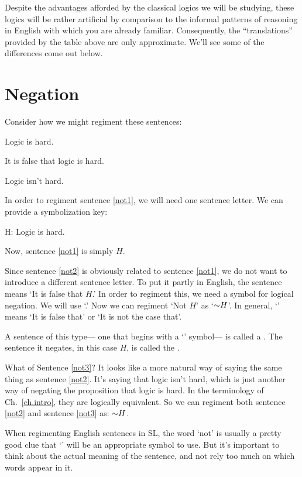 Despite the advantages afforded by the classical logics we will be studying, these logics will be rather artificial by comparison to the informal patterns of reasoning in English with which you are already familiar.
Consequently, the ``translations'' provided by the table above are only approximate.
We'll see some of the differences come out below.

\section{Negation}
Consider how we might regiment these sentences:
\begin{earg}
\item[\ex{not1}] Logic is hard.
\item[\ex{not2}] It is false that logic is hard.
\item[\ex{not3}] Logic isn't hard.
\end{earg}

In order to regiment sentence \ref{not1}, we will need one sentence letter.
We can provide a symbolization key:

\begin{ekey}
\item[H:]Logic is hard.
\end{ekey}

Now, sentence \ref{not1} is simply $H$. 

Since sentence \ref{not2} is obviously related to sentence \ref{not1}, we do not want to introduce a different sentence letter.
To put it partly in English, the sentence means `It is false that $H$.'
In order to regiment this, we need a symbol for logical negation.
We will use `\enot.'
Now we can regiment `Not $H$' as `$\enot H$'.
In general, `\enot' means `It is false that' or `It is not the case that'.

A sentence of this type--- one that begins with a `\enot' symbol--- is called a .
The sentence it negates, in this case $H$, is called the .

What of Sentence \ref{not3}? It looks like a more natural  way of saying the same thing as sentence \ref{not2}.
It's saying that logic isn't hard, which is just another way of negating the proposition that logic is hard.
In the terminology of Ch.\ \ref{ch.intro}, they are logically equivalent.
So we can regiment both sentence \ref{not2} and sentence \ref{not3} as: $\enot H$.

When regimenting English sentences in SL, the word `not' is usually a pretty good clue that `\enot' will be an appropriate symbol to use.
But it's important to think about the actual meaning of the sentence, and not rely too much on which words appear in it.

